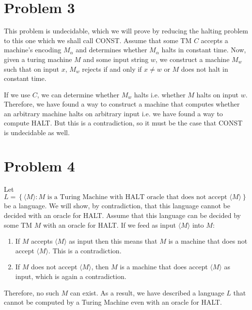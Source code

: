 \documentclass[usletter]{article}
\begin{document}
\newpage

\section*{Problem 3}

This problem is undecidable, which we will prove by reducing the halting problem to this one which we shall call CONST. Assume that some TM \(C\) accepts a machine's encoding \(M_{\alpha}\) and determines whether \(M_{\alpha}\)
halts in constant time. Now, given a turing machine \(M\) and some input string \(w\), we construct a machine \(M_w\) such that on input \(x\), \(M_w\) rejects if and only if \(x\neq w\) or \(M\) does not halt in constant time. 

If we use \(C\), we can determine whether \(M_{w}\) halts i.e. whether \(M\) halts on input \(w\). Therefore, we have found a way to construct a machine that computes whether 
an arbitrary machine halts on arbitrary input i.e. we have found a way to compute HALT. But this is a contradiction, so it must be the case that CONST is undecidable as well. 

\newpage

\section*{Problem 4}

Let \(L = \left\{ \langle M \rangle : M \text{ is a Turing Machine with HALT oracle that does not accept } \langle M \rangle \right\}\) be a language. We will show,
by contradiction, that this language cannot be decided with an oracle for HALT. Assume that this language can be decided by
some TM \(M\) with an oracle for HALT. If we feed as input \(\langle M \rangle\) into \(M\):
\begin{enumerate}
    \item If \(M\) accepts \(\langle M \rangle\) as input then this means that \(M\) is a machine that does not accept \(\langle M \rangle\). This is a contradiction.
    \item If \(M\) does not accept \(\langle M \rangle\), then \(M\) is a machine that does accept \(\langle M \rangle\) as input, which is again a contradiction. 
\end{enumerate}

Therefore, no such \(M\) can exist. As a result, we have described a language \(L\) that cannot be computed by a Turing Machine even with an oracle for HALT. 

\newpage
\end{document}
